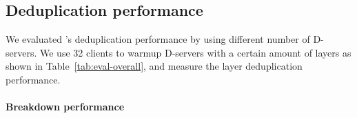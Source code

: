 \subsection{Deduplication performance}

We evaluated \sysname's deduplication performance by using different number of D-servers.
We use 32 clients to warmup D-servers with a certain amount of 
layers as shown in Table~\ref{tab:eval-overall},
and measure the layer deduplication performance.


\paragraph{Breakdown performance}



